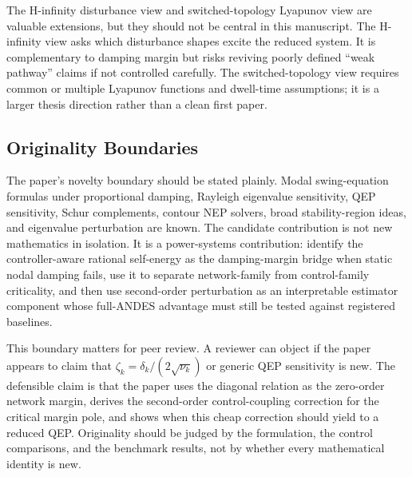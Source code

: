 \documentclass[journal]{IEEEtran}
\begin{document}
The H-infinity disturbance view and switched-topology Lyapunov view are valuable extensions, but they should not be central in this manuscript. The H-infinity view asks which disturbance shapes excite the reduced system. It is complementary to damping margin but risks reviving poorly defined ``weak pathway'' claims if not controlled carefully. The switched-topology view requires common or multiple Lyapunov functions and dwell-time assumptions; it is a larger thesis direction rather than a clean first paper.

\subsection{Originality Boundaries}

The paper's novelty boundary should be stated plainly. Modal swing-equation formulas under proportional damping, Rayleigh eigenvalue sensitivity, QEP sensitivity, Schur complements, contour NEP solvers, broad stability-region ideas, and eigenvalue perturbation are known. The candidate contribution is not new mathematics in isolation. It is a power-systems contribution: identify the controller-aware rational self-energy as the damping-margin bridge when static nodal damping fails, use it to separate network-family from control-family criticality, and then use second-order perturbation as an interpretable estimator component whose full-ANDES advantage must still be tested against registered baselines.

This boundary matters for peer review. A reviewer can object if the paper appears to claim that $\zeta_k=\delta_k/(2\sqrt{\nu_k})$ or generic QEP sensitivity is new. The defensible claim is that the paper uses the diagonal relation as the zero-order network margin, derives the second-order control-coupling correction for the critical margin pole, and shows when this cheap correction should yield to a reduced QEP. Originality should be judged by the formulation, the control comparisons, and the benchmark results, not by whether every mathematical identity is new.
\end{document}

